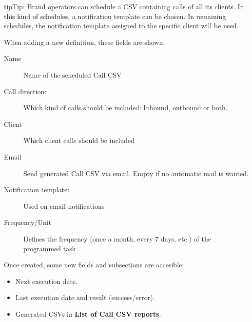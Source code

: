 \documentclass[letterpaper,10pt,english]{sphinxmanual}
\begin{document}
\begin{notice}{tip}{Tip:}
Brand operators can schedule a CSV containing calls of all its clients.
In this kind of schedules, a notification template can be chosen. In remaining
schedules, the notification template assigned to the specific client will be used.
\end{notice}

When adding a new definition, these fields are shown:
\begin{description}
\item[{Name}] \leavevmode{}\label{administration_portal/client/vpbx/calls/call_csv_schedulers:term-name}
Name of the scheduled Call CSV

\item[{Call direction:}] \leavevmode{}\label{administration_portal/client/vpbx/calls/call_csv_schedulers:term-call-direction}
Which kind of calls should be included: Inbound, outbound or both.

\item[{Client}] \leavevmode{}\label{administration_portal/client/vpbx/calls/call_csv_schedulers:term-client}
Which client calls should be included

\item[{Email}] \leavevmode{}\label{administration_portal/client/vpbx/calls/call_csv_schedulers:term-email}
Send generated Call CSV via email. Empty if no automatic mail is wanted.

\item[{Notification template:}] \leavevmode{}\label{administration_portal/client/vpbx/calls/call_csv_schedulers:term-notification-template}
Used on email notifications

\item[{Frequency/Unit}] \leavevmode{}\label{administration_portal/client/vpbx/calls/call_csv_schedulers:term-frequency-unit}
Defines the frequency (once a month, every 7 days, etc.) of the programmed task

\end{description}

Once created, some new fields and subsections are accesible:
\begin{itemize}
\item {} 
Next execution date.

\item {} 
Last execution date and result (success/error).

\item {} 
Generated CSVs in \textbf{List of Call CSV reports}.

\end{itemize}
\end{document}
